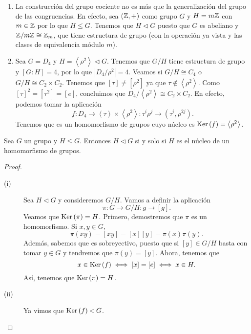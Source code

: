 \begin{eg}
\begin{enumerate}
\item La construcción del grupo cociente no es más que la generalización del grupo de las congruencias. En efecto, sea $\displaystyle \left(\mathbb{Z}, + \right) $ como grupo $\displaystyle G $ y $\displaystyle H = m\mathbb{Z} $ con $\displaystyle m \in \mathbb{Z} $ por lo que $\displaystyle H \leq G $. Tenemos que $\displaystyle H \lhd G $ puesto que $\displaystyle G $ es abeliano y $\displaystyle \mathbb{Z}/m\mathbb{Z} \cong \mathbb{Z}_{m} $, que tiene estructura de grupo (con la operación ya vista y las clases de equivalencia módulo $\displaystyle m $).
\item Sea $\displaystyle G = D_{4} $ y $\displaystyle H = \left\langle \rho^{2} \right\rangle  \lhd G $. Tenemos que $\displaystyle G/H $ tiene estructura de grupo y $\displaystyle [G:H] = 4 $, por lo que $\displaystyle \left|D_{4}/\rho^{2}\right| = 4 $. Veamos si $\displaystyle G/H \cong C_{4} $ o $\displaystyle G/H \cong C_{2} \times C_{2} $. 
Tenemos que $\displaystyle \left[\tau\right] \neq [\rho^{2}] $ ya que $\displaystyle \tau \not\in \left\langle \rho^{2} \right\rangle  $. Como $\displaystyle [\tau]^{2} = [\tau^{2}] = [e]$, concluimos que $\displaystyle D_{4}/\left\langle \rho^{2} \right\rangle \cong C_{2} \times C_{2} $. En efecto, podemos tomar la aplicación 
\[ f : D_{4} \to \left\langle \tau \right\rangle \times \left\langle \rho^{2} \right\rangle : \tau^{i}\rho^{j} \to \left(\tau^{i}, \rho^{2j}\right).\]
Tenemos que es un homomorfismo de grupos cuyo núcleo es $\displaystyle \operatorname{Ker}\left(f\right) = \left\langle \rho^{2} \right\rangle  $.
\end{enumerate}
\end{eg}
\begin{prop}
Sea $\displaystyle G $ un grupo y $\displaystyle H \leq G $. Entonces $\displaystyle H \lhd G $ si y solo si $\displaystyle H  $ es el núcleo de un homomorfismo de grupos.
\end{prop}
\begin{proof}
\begin{description}
\item[(i)] Sea $\displaystyle H \lhd G $ y consideremos $\displaystyle G/H $. Vamos a definir la aplicación 
	\[\pi : G \to G/H : g \to [g] .\]
Veamos que $\displaystyle \operatorname{Ker}\left(\pi \right) = H $. Primero, demostremos que $\displaystyle \pi  $ es un homomorfismo. Si $\displaystyle x,y \in G $,
\[ \pi\left(xy\right) = [xy] = [x][y] = \pi\left(x\right) \pi \left(y\right).\]
Además, sabemos que es sobreyectivo, puesto que si $\displaystyle [y] \in G/H $ basta con tomar $\displaystyle y \in G $ y tendremos que $\displaystyle \pi\left(y\right) = [y] $. Ahora, tenemos que 
\[x \in \operatorname{Ker}\left(f\right) \iff [x] = [e] \iff x \in H .\]
Así, tenemos que $\displaystyle \operatorname{Ker}\left(\pi \right) = H $. 
\item[(ii)] Ya vimos que $\displaystyle \operatorname{Ker}\left(f\right) \lhd G $. 
\end{description}
\end{proof}
